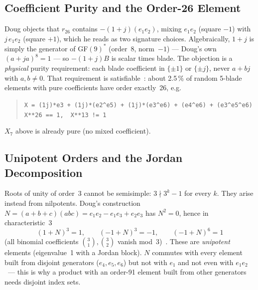 \subsection{Coefficient Purity and the Order-26 Element}

Doug objects that $r_{26}$ contains $-(1+j)(e_1e_2)$, mixing $e_1e_2$ (square $-1$)
with $j\,e_1e_2$ (square $+1$), which he reads as two signature choices.
Algebraically, $1+j$ is simply the generator of GF$(9)^*$ (order~8, norm~$-1$) ---
Doug's own $(a+ja)^8=1$ --- so $-(1+j)B$ is scalar times blade. The objection is a
\emph{physical} purity requirement: each blade coefficient in $\{\pm1\}$ or $\{\pm j\}$,
never $a+bj$ with $a,b\neq0$. That requirement is satisfiable~\BM: about 2.5\,\% of
random 5-blade elements with pure coefficients have order exactly~26, e.g.
\begin{quote}\small
\texttt{X = (1j)*e3 + (1j)*(e2\^{}e5) + (1j)*(e3\^{}e6) + (e4\^{}e6) + (e3\^{}e5\^{}e6)}\\
\texttt{X**26 == 1,\ \ X**13 != 1}
\end{quote}
$X_7$ above is already pure (no mixed coefficient).

\subsection{Unipotent Orders and the Jordan Decomposition}

Roots of unity of order~3 cannot be semisimple: $3 \nmid 3^k-1$ for every $k$.
They arise instead from nilpotents. Doug's construction
$N=(a+b+c)(abc)=e_1e_2-e_1e_3+e_2e_3$ has $N^2=0$, hence in characteristic~3
\begin{equation}
  (1+N)^3 = 1,\qquad (-1+N)^3=-1,\qquad (-1+N)^6 = 1
\end{equation}
(all binomial coefficients $\binom{3}{1},\binom{3}{2}$ vanish mod~3)~\BM.
These are \emph{unipotent} elements (eigenvalue~1 with a Jordan block).
$N$ commutes with every element built from disjoint generators ($e_4,e_5,e_6$)
but not with $e_1$ and not even with $e_1e_2$~\BM --- this is why a product with
an order-91 element built from other generators needs disjoint index sets.

